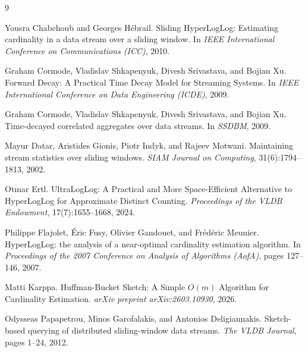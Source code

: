 \documentclass{article}
\begin{document}

\begin{thebibliography}{9}

Yousra Chabchoub and Georges H{\'e}brail.
\newblock Sliding HyperLogLog: Estimating cardinality in a data stream over a sliding window.
\newblock In \emph{IEEE International Conference on Communications (ICC)}, 2010.

Graham Cormode, Vladislav Shkapenyuk, Divesh Srivastava, and Bojian Xu.
\newblock Forward Decay: A Practical Time Decay Model for Streaming Systems.
\newblock In \emph{IEEE International Conference on Data Engineering (ICDE)}, 2009.

Graham Cormode, Vladislav Shkapenyuk, Divesh Srivastava, and Bojian Xu.
\newblock Time-decayed correlated aggregates over data streams.
\newblock In \emph{SSDBM}, 2009.

Mayur Datar, Aristides Gionis, Piotr Indyk, and Rajeev Motwani.
\newblock Maintaining stream statistics over sliding windows.
\newblock \emph{SIAM Journal on Computing}, 31(6):1794--1813, 2002.

Otmar Ertl.
\newblock UltraLogLog: A Practical and More Space-Efficient Alternative to HyperLogLog for Approximate Distinct Counting.
\newblock \emph{Proceedings of the VLDB Endowment}, 17(7):1655--1668, 2024.

Philippe Flajolet, {\'E}ric Fusy, Olivier Gandouet, and Fr{\'e}d{\'e}ric Meunier.
\newblock HyperLogLog: the analysis of a near-optimal cardinality estimation algorithm.
\newblock In \emph{Proceedings of the 2007 Conference on Analysis of Algorithms (AofA)}, pages 127--146, 2007.

Matti Karppa.
\newblock Huffman-Bucket Sketch: A Simple $O(m)$ Algorithm for Cardinality Estimation.
\newblock \emph{arXiv preprint arXiv:2603.10930}, 2026.

Odysseas Papapetrou, Minos Garofalakis, and Antonios Deligiannakis.
\newblock Sketch-based querying of distributed sliding-window data streams.
\newblock \emph{The VLDB Journal}, pages 1--24, 2012.

\end{thebibliography}
\end{document}
